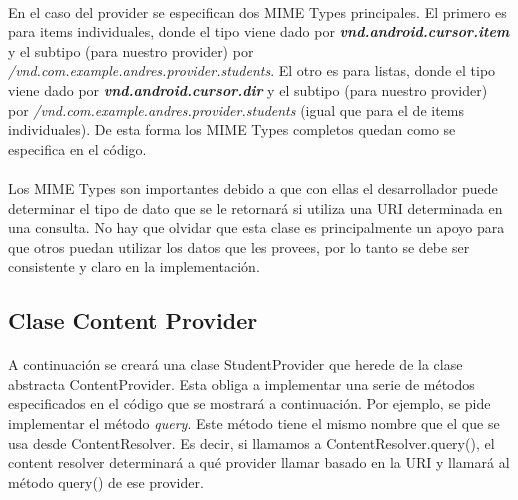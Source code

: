 \documentclass[10pt]{extarticle}
\begin{document}
\paragraph{}
En el caso del provider se especifican dos MIME Types principales. El primero es para items individuales, donde el tipo viene dado por \textit{\textbf{vnd.android.cursor.item}} y el subtipo (para nuestro provider) por \textit{/vnd.com.example.andres.provider.students}. El otro es para listas, donde el tipo viene dado por \textit{\textbf{vnd.android.cursor.dir}} y el subtipo (para nuestro provider) por   \textit{/vnd.com.example.andres.provider.students} (igual que para el de items individuales). De esta forma los MIME Types completos quedan como se especifica en el código.

\paragraph{}
Los MIME Types son importantes debido a que con ellas el desarrollador puede determinar el tipo de dato que se le retornará si utiliza una URI determinada en una consulta. No hay que olvidar que esta clase es principalmente un apoyo para que otros puedan utilizar los datos que les provees, por lo tanto se debe ser consistente y claro en la implementación.

\subsection{Clase Content Provider}

\paragraph{}
A continuación se creará una clase StudentProvider que herede de la clase abstracta ContentProvider. Esta obliga a implementar una serie de métodos especificados en el código que se mostrará a continuación. Por ejemplo, se pide implementar el método \textit{query}. Este método tiene el mismo nombre que el que se usa desde ContentResolver. Es decir, si llamamos a ContentResolver.query(), el content resolver determinará a qué provider llamar basado en la URI y llamará al método query() de ese provider.
\end{document}
